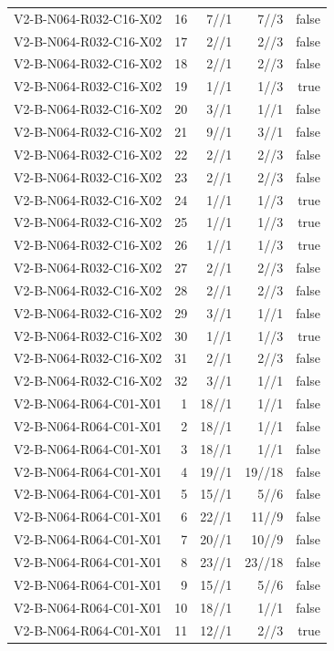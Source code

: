 {\begin{longtable}{lrrrr}
V2-B-N064-R032-C16-X02 & 16 & 7//1 & 7//3 & false \\
V2-B-N064-R032-C16-X02 & 17 & 2//1 & 2//3 & false \\
V2-B-N064-R032-C16-X02 & 18 & 2//1 & 2//3 & false \\
V2-B-N064-R032-C16-X02 & 19 & 1//1 & 1//3 & true \\
V2-B-N064-R032-C16-X02 & 20 & 3//1 & 1//1 & false \\
V2-B-N064-R032-C16-X02 & 21 & 9//1 & 3//1 & false \\
V2-B-N064-R032-C16-X02 & 22 & 2//1 & 2//3 & false \\
V2-B-N064-R032-C16-X02 & 23 & 2//1 & 2//3 & false \\
V2-B-N064-R032-C16-X02 & 24 & 1//1 & 1//3 & true \\
V2-B-N064-R032-C16-X02 & 25 & 1//1 & 1//3 & true \\
V2-B-N064-R032-C16-X02 & 26 & 1//1 & 1//3 & true \\
V2-B-N064-R032-C16-X02 & 27 & 2//1 & 2//3 & false \\
V2-B-N064-R032-C16-X02 & 28 & 2//1 & 2//3 & false \\
V2-B-N064-R032-C16-X02 & 29 & 3//1 & 1//1 & false \\
V2-B-N064-R032-C16-X02 & 30 & 1//1 & 1//3 & true \\
V2-B-N064-R032-C16-X02 & 31 & 2//1 & 2//3 & false \\
V2-B-N064-R032-C16-X02 & 32 & 3//1 & 1//1 & false \\
V2-B-N064-R064-C01-X01 & 1 & 18//1 & 1//1 & false \\
V2-B-N064-R064-C01-X01 & 2 & 18//1 & 1//1 & false \\
V2-B-N064-R064-C01-X01 & 3 & 18//1 & 1//1 & false \\
V2-B-N064-R064-C01-X01 & 4 & 19//1 & 19//18 & false \\
V2-B-N064-R064-C01-X01 & 5 & 15//1 & 5//6 & false \\
V2-B-N064-R064-C01-X01 & 6 & 22//1 & 11//9 & false \\
V2-B-N064-R064-C01-X01 & 7 & 20//1 & 10//9 & false \\
V2-B-N064-R064-C01-X01 & 8 & 23//1 & 23//18 & false \\
V2-B-N064-R064-C01-X01 & 9 & 15//1 & 5//6 & false \\
V2-B-N064-R064-C01-X01 & 10 & 18//1 & 1//1 & false \\
V2-B-N064-R064-C01-X01 & 11 & 12//1 & 2//3 & true \\

\end{longtable}}
